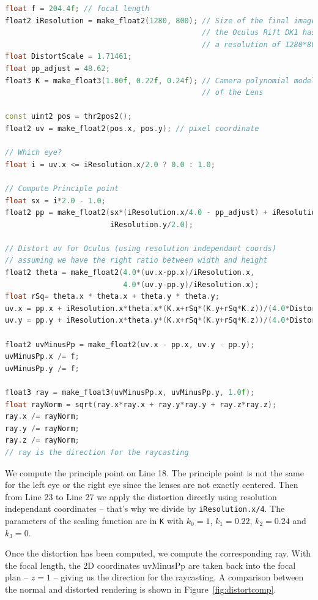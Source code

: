 \documentclass[12pt]{article}
\begin{document}
\begin{lstlisting}[language=C++, caption={C++ code for the Lens distortion}, label={lst:lensray}]
float f = 204.4f; // focal length
float2 iResolution = make_float2(1280, 800); // Size of the final image:
                                             // the Oculus Rift DK1 has
                                             // a resolution of 1280*800
float DistortScale = 1.71461;
float pp_adjust = 48.62;
float3 K = make_float3(1.00f, 0.22f, 0.24f); // Camera polynomial model
                                             // of the Lens

const uint2 pos = thr2pos2();
float2 uv = make_float2(pos.x, pos.y); // pixel coordinate
    
// Which eye?
float i = uv.x <= iResolution.x/2.0 ? 0.0 : 1.0;

// Compute Principle point
float sx = i*2.0 - 1.0;
float2 pp = make_float2(sx*(iResolution.x/4.0 - pp_adjust) + iResolution.x/2.0,
                        iResolution.y/2.0);

// Distort uv for Oculus (using resolution independant coords)
// assuming we have the right ratio between width and height
float2 theta = make_float2(4.0*(uv.x-pp.x)/iResolution.x,
                           4.0*(uv.y-pp.y)/iResolution.x);
float rSq= theta.x * theta.x + theta.y * theta.y;
uv.x = pp.x + iResolution.x*theta.x*(K.x+rSq*(K.y+rSq*K.z))/(4.0*DistortScale);
uv.y = pp.y + iResolution.x*theta.y*(K.x+rSq*(K.y+rSq*K.z))/(4.0*DistortScale);

float2 uvMinusPp = make_float2(uv.x - pp.x, uv.y - pp.y);
uvMinusPp.x /= f;
uvMinusPp.y /= f;

float3 ray = make_float3(uvMinusPp.x, uvMinusPp.y, 1.0f);
float rayNorm = sqrt(ray.x*ray.x + ray.y*ray.y + ray.z*ray.z);
ray.x /= rayNorm;
ray.y /= rayNorm;
ray.z /= rayNorm;
// ray is the direction for the raycasting
\end{lstlisting}

We compute the principle point on Line 18. The principle point is not the same for the left eye or the right eye since the lenses are not exactly centered. Then from Line 23 to Line 27 we apply the distortion directly using resolution independant coordinates -- that's why we divide by \texttt{iResolution.x/4}. The parameters of the scaling function are in \texttt{K} with $k_0 = 1$, $k_1 = 0.22$, $k_2 = 0.24$ and $k_3 = 0$.

Once the distortion has been computed, we compute the corresponding ray. With the focal length, the 2D coordinates uvMinusPp are taken back into the focal plan -- $z = 1$ -- giving us the direction for the raycasting. A comparison between the normal and distorted rendering is shown in Figure~\ref{fig:distortcomp}.
\end{document}
